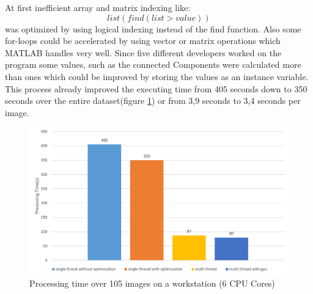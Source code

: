 \documentclass{article}
\begin{document}
At first inefficient array and matrix indexing like:
\[
list(find(list > value))
\]
was optimized by using logical indexing instead of the find function.
Also some for-loops could be accelerated by using vector or matrix operations which MATLAB handles very well.
Since five different developers worked on the program some values, such as the connected Components were calculated more than ones which could be improved by storing the values as an instance variable.
This process already improved the executing time from 405 seconds down to 350 seconds over the entire dataset(figure \ref{fig:OptWorkstation}) or from 3,9 seconds to 3,4 seconds per image.
\begin{figure}[!htbp]
	
	\includegraphics[width=1\linewidth]{OptWorkstation.png}
	
	\caption{Processing time over 105 images on a workstation (6 CPU Cores)} %
	\label{fig:OptWorkstation} 
\end{figure}
\end{document}
